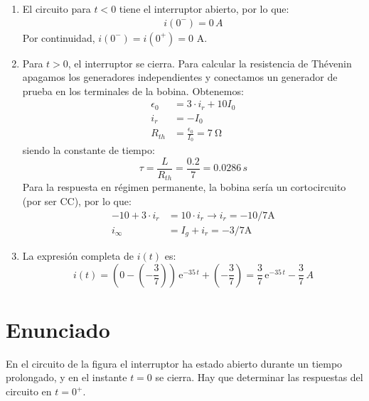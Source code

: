 \begin{enumerate}
    \item El circuito para $t<0$ tiene el interruptor abierto, por lo que:
    \begin{align*}
        i(0^-)=0\,A
    \end{align*}
    Por continuidad, $i(0^-)=i(0^+)=0$ A. 
    \item Para $t>0$, el interruptor se cierra. Para calcular la resistencia de Thévenin apagamos los generadores independientes y conectamos un generador de prueba en los terminales de la bobina. Obtenemos:
    \begin{align*}
      \epsilon_0 &= 3\cdot i_r + 10 I_0\\
      i_r &= - I_0\\
      R_{th} &= \frac{\epsilon_0}{I_0} = \qty{7}{\ohm}
    \end{align*}
    siendo la constante de tiempo:
    \begin{equation*}
        \tau=\dfrac{L}{R_{th}}=\dfrac{0.2}{7}=0.0286\,s
    \end{equation*}
    Para la respuesta en régimen permanente, la bobina sería un cortocircuito (por ser CC), por lo que:
    \begin{align*}
      -10 + 3 \cdot i_r &= 10 \cdot i_r \rightarrow i_r = -10/7\unit{\ampere}\\
      i_{\infty} &= I_g + i_r = -3/7\unit{\ampere}
    \end{align*}
    
    \item La expresión completa de $i(t)$ es:
    \begin{equation*}
        i(t)=\left(0-\left(-\dfrac{3}{7}\right) \right)\,\mathrm{e}^{-35\,t}+\left(-\dfrac{3}{7}\right)=\dfrac{3}{7}\,\mathrm{e}^{-35\,t}-\dfrac{3}{7}\,A
    \end{equation*}
\end{enumerate}

\section{Enunciado}
En el circuito de la figura el interruptor ha estado abierto durante un tiempo
prolongado, y en el instante $t = 0$ se cierra. Hay que determinar las
respuestas del circuito en $t = 0^+$.

